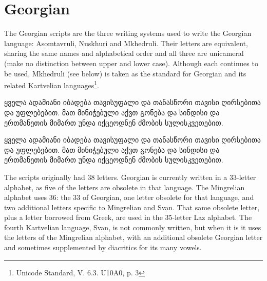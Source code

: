 \newfontfamily{}
\newfontfamily{}

\section{Georgian}
\label{s:georgian}
The Georgian scripts are the three writing systems used to write the Georgian language: Asomtavruli, Nuskhuri and Mkhedruli. Their letters are equivalent, sharing the same names and alphabetical order and all three are unicameral (make no distinction between upper and lower case). Although each continues to be used, Mkhedruli (see below) is taken as the standard for Georgian and its related Kartvelian languages\footnote{Unicode Standard, V. 6.3. U10A0, p. 3}. 

\bgroup
\topline



\begin{scriptexample}[]{}
\georgian 

\centering
 
ყველა ადამიანი იბადება თავისუფალი და თანასწორი თავისი ღირსებითა და უფლებებით. მათ მინიჭებული აქვთ გონება და სინდისი და ერთმანეთის მიმართ უნდა იქცეოდნენ ძმობის სულისკვეთებით.
\medskip

\georgianarial
ყველა ადამიანი იბადება თავისუფალი და თანასწორი თავისი ღირსებითა და უფლებებით. მათ მინიჭებული აქვთ გონება და სინდისი და ერთმანეთის მიმართ უნდა იქცეოდნენ ძმობის სულისკვეთებით.
\bottomline
{}

\end{scriptexample}

The scripts originally had 38 letters. Georgian is currently written in a 33-letter alphabet, as five of the letters are obsolete in that language. The Mingrelian alphabet uses 36: the 33 of Georgian, one letter obsolete for that language, and two additional letters specific to Mingrelian and Svan. That same obsolete letter, plus a letter borrowed from Greek, are used in the 35-letter Laz alphabet. The fourth Kartvelian language, Svan, is not commonly written, but when it is it uses the letters of the Mingrelian alphabet, with an additional obsolete Georgian letter and sometimes supplemented by diacritics for its many vowels.